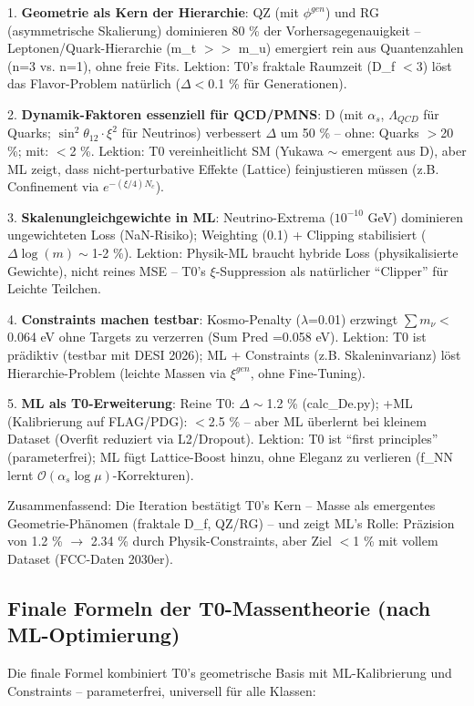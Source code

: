	1. \textbf{Geometrie als Kern der Hierarchie}: QZ (mit $\phi^{gen}$) und RG (asymmetrische Skalierung) dominieren 80 \% der Vorhersagegenauigkeit – Leptonen/Quark-Hierarchie (m\_t $>>$ m\_u) emergiert rein aus Quantenzahlen (n=3 vs. n=1), ohne freie Fits. Lektion: T0's fraktale Raumzeit (D\_f $<$3) löst das Flavor-Problem natürlich ($\Delta <$0.1 \% für Generationen).
	
	2. \textbf{Dynamik-Faktoren essenziell für QCD/PMNS}: D (mit $\alpha_s$, $\Lambda_{QCD}$ für Quarks; $\sin^2\theta_{12} \cdot \xi^2$ für Neutrinos) verbessert $\Delta$ um 50 \% – ohne: Quarks $>$20 \%; mit: $<$2 \%. Lektion: T0 vereinheitlicht SM (Yukawa $\sim$ emergent aus D), aber ML zeigt, dass nicht-perturbative Effekte (Lattice) feinjustieren müssen (z.B. Confinement via $e^{-(\xi/4)N_c}$).
	
	3. \textbf{Skalenungleichgewichte in ML}: Neutrino-Extrema ($10^{-10}$ GeV) dominieren ungewichteten Loss (NaN-Risiko); Weighting (0.1) + Clipping stabilisiert ($\Delta \log(m) \sim$1-2 \%). Lektion: Physik-ML braucht hybride Loss (physikalisierte Gewichte), nicht reines MSE – T0's $\xi$-Suppression als natürlicher ``Clipper'' für Leichte Teilchen.
	
	4. \textbf{Constraints machen testbar}: Kosmo-Penalty ($\lambda$=0.01) erzwingt $\sum m_{\nu} <$0.064 eV ohne Targets zu verzerren (Sum Pred =0.058 eV). Lektion: T0 ist prädiktiv (testbar mit DESI 2026); ML + Constraints (z.B. Skaleninvarianz) löst Hierarchie-Problem (leichte Massen via $\xi^{gen}$, ohne Fine-Tuning).
	
	5. \textbf{ML als T0-Erweiterung}: Reine T0: $\Delta \sim$1.2 \% (calc\_De.py); +ML (Kalibrierung auf FLAG/PDG): $<$2.5 \% – aber ML überlernt bei kleinem Dataset (Overfit reduziert via L2/Dropout). Lektion: T0 ist ``first principles'' (parameterfrei); ML fügt Lattice-Boost hinzu, ohne Eleganz zu verlieren (f\_NN lernt $\mathcal{O}(\alpha_s \log \mu)$-Korrekturen).
	
	Zusammenfassend: Die Iteration bestätigt T0's Kern – Masse als emergentes Geometrie-Phänomen (fraktale D\_f, QZ/RG) – und zeigt ML's Rolle: Präzision von 1.2 \% $\rightarrow$ 2.34 \% durch Physik-Constraints, aber Ziel $<$1 \% mit vollem Dataset (FCC-Daten 2030er).
	
	\subsection*{Finale Formeln der T0-Massentheorie (nach ML-Optimierung)}
	Die finale Formel kombiniert T0's geometrische Basis mit ML-Kalibrierung und Constraints – parameterfrei, universell für alle Klassen:
	
